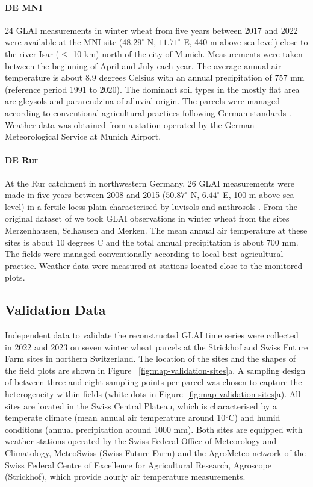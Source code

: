 \paragraph{DE MNI}
24 \gls{GLAI} measurements in winter wheat from five years between 2017 and 2022 were available at the MNI site ($48.29^\circ$ N, $11.71^\circ$ E, 440 m above sea level) close to the river Isar ($\le$ 10 km) north of the city of Munich. Measurements were taken between the beginning of April and July each year. The average annual air temperature is about 8.9 degrees Celsius with an annual precipitation of 757 mm (reference period 1991 to 2020). The dominant soil types in the mostly flat area are gleysols and pararendzina of alluvial origin. The parcels were managed according to conventional agricultural practices following German standards \citep{danner_retrieval_2017, danner_fitted_2019, wocher_physically-based_2018}. Weather data was obtained from a station operated by the German Meteorological Service at Munich Airport.

\paragraph{DE Rur}
At the Rur catchment in northwestern Germany, 26 \gls{GLAI} measurements were made in five years between 2008 and 2015 ($50.87^\circ$ N, $6.44^\circ$ E, 100 m above sea level) in a fertile loess plain characterised by luvisols and anthrosols \citep{reichenau_comprehensive_2020}. From the original dataset of \cite{reichenau_comprehensive_2020} we took \gls{GLAI} observations in winter wheat from the sites Merzenhausen, Selhausen and Merken. The mean annual air temperature at these sites is about 10 degrees C and the total annual precipitation is about 700 mm. The fields were managed conventionally according to local best agricultural practice. Weather data were measured at stations located close to the monitored plots.

\subsection{Validation Data}
\label{subsec:validation-data}
Independent data to validate the reconstructed \gls{GLAI} time series were collected in 2022 and 2023 on seven winter wheat parcels at the Strickhof and Swiss Future Farm sites in northern Switzerland. The location of the sites and the shapes of the field plots are shown in Figure ~\ref{fig:map-validation-sites}a.  A sampling design of between three and eight sampling points per parcel was chosen to capture the heterogeneity within fields (white dots in Figure~\ref{fig:map-validation-sites}a). All sites are located in the Swiss Central Plateau, which is characterised by a temperate climate (mean annual air temperature around 10°C) and humid conditions (annual precipitation around 1000 mm). Both sites are equipped with weather stations operated by the Swiss Federal Office of Meteorology and Climatology, MeteoSwiss (Swiss Future Farm) and the AgroMeteo network of the Swiss Federal Centre of Excellence for Agricultural Research, Agroscope (Strickhof), which provide hourly air temperature measurements.

